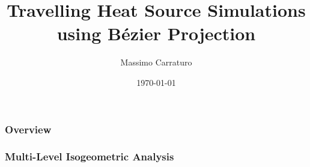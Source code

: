 \documentclass{beamer}
\title[]{Travelling Heat Source Simulations using B{\'e}zier Projection} %
\author{Massimo Carraturo} %
\institute[University of Pavia] %
{ \\ %
\medskip
\textit{massimo.carraturo01@universitadipavia.it} %
}
\date{\today} %
\begin{document}
\begin{frame}
\titlepage %
\end{frame}

\begin{frame}
\frametitle{Overview} %
\tableofcontents %
\end{frame}

%

\begin{frame}
	\frametitle{Multi-Level Isogeometric Analysis}
	\centering
	
\end{frame}
\end{document}
